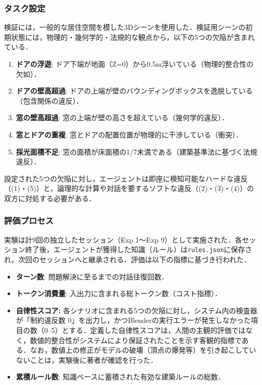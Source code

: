 \documentclass[dvipdfmx, a4paper, 9pt]{deimj}
\begin{document}
\subsubsection{タスク設定}

検証には，一般的な居住空間を模した3Dシーンを使用した．検証用シーンの初期状態には，物理的・幾何学的・法規的な観点から，以下の5つの欠陥が含まれている．

\begin{enumerate}
  \item \textbf{ドアの浮遊}: ドア下端が地面（Z=0）から0.5m浮いている（物理的整合性の欠如）．
  \item \textbf{ドアの壁高超過}: ドアの上端が壁のバウンディングボックスを逸脱している（包含関係の違反）．
  \item \textbf{窓の壁高超過}: 窓の上端が壁の高さを超えている（幾何学的違反）．
  \item \textbf{窓とドアの重複}: 窓とドアの配置位置が物理的に干渉している（衝突）．
  \item \textbf{採光面積不足}: 窓の面積が床面積の1/7未満である（建築基準法に基づく法規違反）．
\end{enumerate}

設定された5つの欠陥に対し，エージェントは即座に検知可能なハードな違反（(1)・(5)）と，論理的な計算や対話を要するソフトな違反（(2)・(3)・(4)）の双方に対処する必要がある．

\subsubsection{評価プロセス}

実験は計9回の独立したセッション（Exp 1〜Exp 9）として実施された．各セッション終了後，エージェントが獲得した知識（ルール）は\texttt{rules.json}に保存され，次回のセッションへと継承される．評価は以下の指標に基づき行われた．

\begin{itemize}
    \item \textbf{ターン数}: 問題解決に至るまでの対話往復回数．
    \item \textbf{トークン消費量}: 入出力に含まれる総トークン数（コスト指標）．
    \item \textbf{自律性スコア:} 
    各シナリオに含まれる5つの欠陥に対し，システム内の検査器が「制約違反数 0」を出力し，かつBlenderの実行エラーが発生しなかった項目の数（0--5）とする．定義した自律性スコアは，人間の主観的評価ではなく，数値的整合性がシステムにより保証されたことを示す客観的指標である．なお，数値上の修正がモデルの破壊（頂点の爆発等）を引き起こしていないことは，実験後に著者が確認を行った．
    \item \textbf{累積ルール数}: 知識ベースに蓄積された有効な建築ルールの総数．
\end{itemize}
\end{document}
